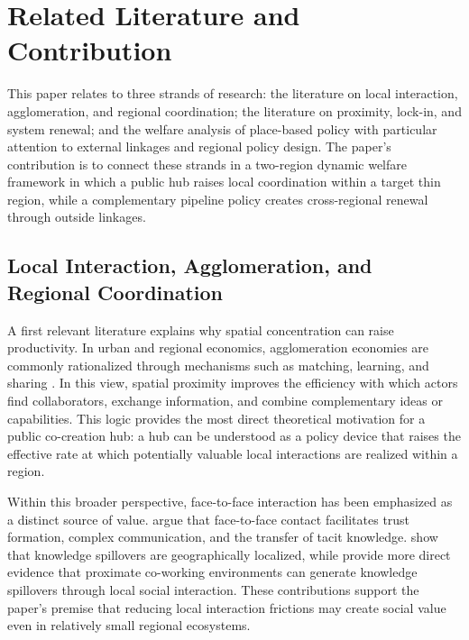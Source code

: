 \section{Related Literature and Contribution}
\label{sec:lit}

This paper relates to three strands of research: the literature on local interaction, agglomeration, and regional coordination; the literature on proximity, lock-in, and system renewal; and the welfare analysis of place-based policy with particular attention to external linkages and regional policy design. The paper's contribution is to connect these strands in a two-region dynamic welfare framework in which a public hub raises local coordination within a target thin region, while a complementary pipeline policy creates cross-regional renewal through outside linkages.

\subsection{Local Interaction, Agglomeration, and Regional Coordination}

A first relevant literature explains why spatial concentration can raise productivity. In urban and regional economics, agglomeration economies are commonly rationalized through mechanisms such as matching, learning, and sharing \citep{DurantonPuga2004,RosenthalStrange2004}. In this view, spatial proximity improves the efficiency with which actors find collaborators, exchange information, and combine complementary ideas or capabilities. This logic provides the most direct theoretical motivation for a public co-creation hub: a hub can be understood as a policy device that raises the effective rate at which potentially valuable local interactions are realized within a region.

Within this broader perspective, face-to-face interaction has been emphasized as a distinct source of value. \citet{StorperVenables2004} argue that face-to-face contact facilitates trust formation, complex communication, and the transfer of tacit knowledge. \citet{JaffeTrajtenbergHenderson1993} show that knowledge spillovers are geographically localized, while \citet{RocheOettlCatalini2024} provide more direct evidence that proximate co-working environments can generate knowledge spillovers through local social interaction. These contributions support the paper's premise that reducing local interaction frictions may create social value even in relatively small regional ecosystems.

